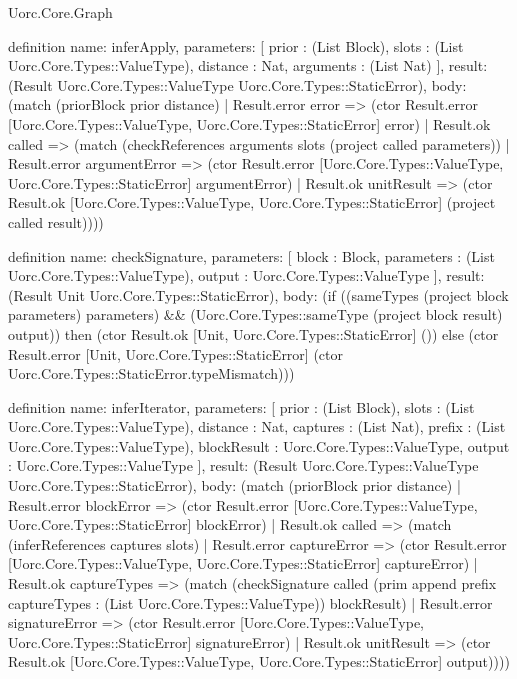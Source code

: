 \begin{lexlean}{Uorc.Core.Graph}
\begin{semanticmodule}
definition{
  name: inferApply,
  parameters: [
    prior : (List Block),
    slots : (List Uorc.Core.Types::ValueType),
    distance : Nat,
    arguments : (List Nat)
  ],
  result: (Result Uorc.Core.Types::ValueType Uorc.Core.Types::StaticError),
  body: (match (priorBlock prior distance)
    | Result.error error => (ctor Result.error [Uorc.Core.Types::ValueType, Uorc.Core.Types::StaticError] error)
    | Result.ok called => (match (checkReferences arguments slots (project called parameters))
      | Result.error argumentError => (ctor Result.error [Uorc.Core.Types::ValueType, Uorc.Core.Types::StaticError] argumentError)
      | Result.ok unitResult => (ctor Result.ok [Uorc.Core.Types::ValueType, Uorc.Core.Types::StaticError] (project called result))))
}

definition{
  name: checkSignature,
  parameters: [
    block : Block,
    parameters : (List Uorc.Core.Types::ValueType),
    output : Uorc.Core.Types::ValueType
  ],
  result: (Result Unit Uorc.Core.Types::StaticError),
  body: (if ((sameTypes (project block parameters) parameters) && (Uorc.Core.Types::sameType (project block result) output)) then (ctor Result.ok [Unit, Uorc.Core.Types::StaticError] ()) else (ctor Result.error [Unit, Uorc.Core.Types::StaticError] (ctor Uorc.Core.Types::StaticError.typeMismatch)))
}

definition{
  name: inferIterator,
  parameters: [
    prior : (List Block),
    slots : (List Uorc.Core.Types::ValueType),
    distance : Nat,
    captures : (List Nat),
    prefix : (List Uorc.Core.Types::ValueType),
    blockResult : Uorc.Core.Types::ValueType,
    output : Uorc.Core.Types::ValueType
  ],
  result: (Result Uorc.Core.Types::ValueType Uorc.Core.Types::StaticError),
  body: (match (priorBlock prior distance)
    | Result.error blockError => (ctor Result.error [Uorc.Core.Types::ValueType, Uorc.Core.Types::StaticError] blockError)
    | Result.ok called => (match (inferReferences captures slots)
      | Result.error captureError => (ctor Result.error [Uorc.Core.Types::ValueType, Uorc.Core.Types::StaticError] captureError)
      | Result.ok captureTypes => (match (checkSignature called (prim append prefix captureTypes : (List Uorc.Core.Types::ValueType)) blockResult)
        | Result.error signatureError => (ctor Result.error [Uorc.Core.Types::ValueType, Uorc.Core.Types::StaticError] signatureError)
        | Result.ok unitResult => (ctor Result.ok [Uorc.Core.Types::ValueType, Uorc.Core.Types::StaticError] output))))
}


\end{semanticmodule}
\end{lexlean}
